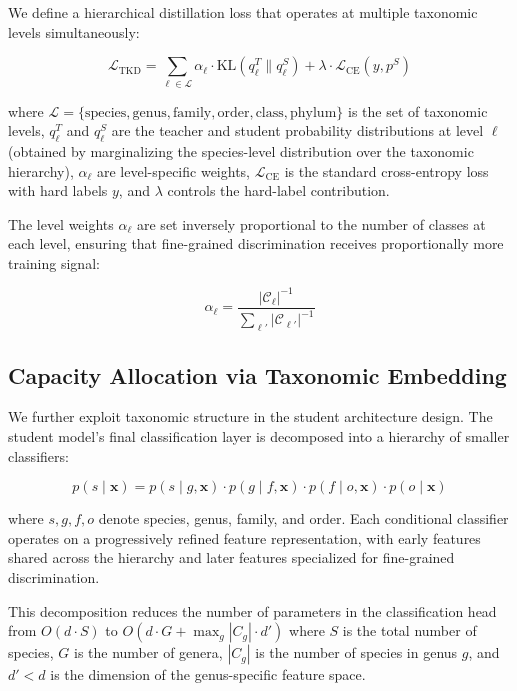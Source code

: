 \documentclass[11pt,a4paper]{article}
\begin{document}
We define a hierarchical distillation loss that operates at multiple taxonomic levels simultaneously:

\begin{equation}
    \mathcal{L}_{\text{TKD}} = \sum_{\ell \in \mathcal{L}} \alpha_\ell \cdot \text{KL}\left(q_\ell^T \| q_\ell^S\right) + \lambda \cdot \mathcal{L}_{\text{CE}}(y, p^S)
\end{equation}

\noindent where $\mathcal{L} = \{\text{species}, \text{genus}, \text{family}, \text{order}, \text{class}, \text{phylum}\}$ is the set of taxonomic levels, $q_\ell^T$ and $q_\ell^S$ are the teacher and student probability distributions at level $\ell$ (obtained by marginalizing the species-level distribution over the taxonomic hierarchy), $\alpha_\ell$ are level-specific weights, $\mathcal{L}_{\text{CE}}$ is the standard cross-entropy loss with hard labels $y$, and $\lambda$ controls the hard-label contribution.

The level weights $\alpha_\ell$ are set inversely proportional to the number of classes at each level, ensuring that fine-grained discrimination receives proportionally more training signal:

\begin{equation}
    \alpha_\ell = \frac{|\mathcal{C}_\ell|^{-1}}{\sum_{\ell'} |\mathcal{C}_{\ell'}|^{-1}}
\end{equation}

\subsection{Capacity Allocation via Taxonomic Embedding}

We further exploit taxonomic structure in the student architecture design.
The student model's final classification layer is decomposed into a hierarchy of smaller classifiers:

\begin{equation}
    p(s \mid \mathbf{x}) = p(s \mid g, \mathbf{x}) \cdot p(g \mid f, \mathbf{x}) \cdot p(f \mid o, \mathbf{x}) \cdot p(o \mid \mathbf{x})
\end{equation}

\noindent where $s, g, f, o$ denote species, genus, family, and order.
Each conditional classifier operates on a progressively refined feature representation, with early features shared across the hierarchy and later features specialized for fine-grained discrimination.

This decomposition reduces the number of parameters in the classification head from $O(d \cdot S)$ to $O(d \cdot G + \max_g |C_g| \cdot d')$ where $S$ is the total number of species, $G$ is the number of genera, $|C_g|$ is the number of species in genus $g$, and $d' < d$ is the dimension of the genus-specific feature space.
\end{document}
